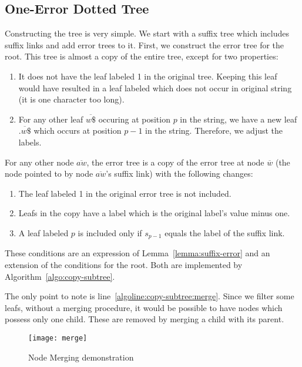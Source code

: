 \subsection{One-Error Dotted Tree}

Constructing the tree is very simple. We start with a suffix tree which includes suffix links and add error trees to it. First, we construct the error tree for the root. This tree is almost a copy of the entire tree, except for two properties:

\begin{enumerate}
\item It does not have the leaf labeled 1 in the original tree. Keeping this leaf would have resulted in a leaf labeled  which does not occur in original string (it is one character too long).
\item For any other leaf $\overline{w\$}$ occuring at position $p$ in the string, we have a new leaf $\overline{.w\$}$ which occurs at position $p-1$ in the string. Therefore, we adjust the labels.

\end{enumerate}

For any other node $\overline{aw}$, the error tree is a copy of the error tree at node $\overline{w}$ (the node pointed to by node $\overline{aw}$'s suffix link) with the following changes:

\begin{enumerate}
\item The leaf labeled 1 in the original error tree is not included.
\item Leafs in the copy have a label which is the original label's value minus one.
\item A leaf labeled $p$ is included only if $s_{p-1}$ equals the label of the suffix link.
\end{enumerate}

These conditions are an expression of Lemma~\ref{lemma:suffix-error} and an extension of the conditions for the root. Both are implemented by Algorithm~\ref{algo:copy-subtree}.



The only point to note is line~\ref{algoline:copy-subtree:merge}. Since we filter some leafs, without a merging procedure, it would be possible to have nodes which possess only one child. These are removed by merging a child with its parent.

\begin{figure}
\centering
\texttt{[image: merge]}
\caption{Node Merging demonstration}%
\label{fig:merge}
\end{figure}

